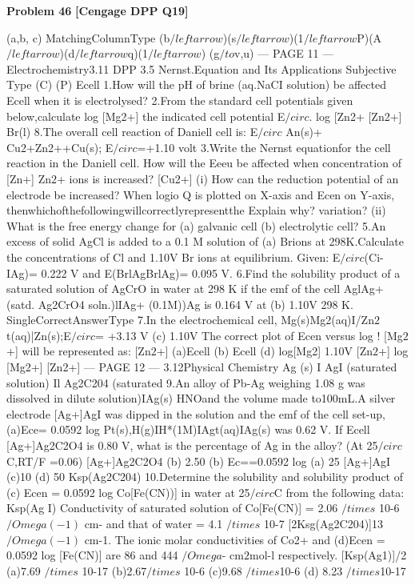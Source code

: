 \begin{problembox}
\textbf{Problem 46} \hfill \textbf{[Cengage DPP Q19]}
\label{q:ext-cng_dpp_all_questions-46}

(a,b, c)
MatchingColumnType
(b$/leftarrow$)(s$/leftarrow$)(1$/leftarrow$P)(A$/leftarrow$)(d$/leftarrow$q)(1$/leftarrow$)
(g$/to$v,u)
--- PAGE 11 ---
Electrochemistry3.11
DPP 3.5
Nernst.Equation and Its Applications
Subjective Type
(C)
(P)
Ecell
1.How will the pH of brine (aq.NaCI solution) be affected
Ecell
when it is electrolysed?
2.From the standard cell potentials given below,calculate
log [Mg2+]
the indicated cell potential E$/circ$.
log
[Zn2+
[Zn2+]
Br(l)
8.The overall cell reaction of Daniell cell is:
E$/circ$
An(s)+ Cu2+Zn2++Cu(s); E$/circ$=+1.10 volt
3.Write the Nernst equationfor the cell reaction in the Daniell
cell. How will the Eeeu be affected when concentration of
[Zn+]
Zn$2$+ ions is increased?
[Cu2+]
(i) How can the reduction potential of an electrode be
increased?
When logio Q is plotted on X-axis and Ecen on Y-axis,
thenwhichofthefollowingwillcorrectlyrepresentthe
Explain why?
variation?
(ii) What is the free energy change for (a) galvanic cell
(b) electrolytic cell?
5.An excess of solid AgCl is added to a 0.1 M solution of
(a)
Brions at 298K.Calculate the concentrations of Cl and
1.10V
Br ions at equilibrium.
Given: E$/circ$(Ci-IAg)= 0.222 V and E(BrlAgBrlAg)=
0.095 V.
6.Find the solubility product of a saturated solution of
AgCrO in water at 298 K if the emf of the cell AglAg+
(satd. Ag2CrO4 soln.)lIAg+ (0.1M))Ag is 0.164 V at
(b)
1.10V
298 K.
SingleCorrectAnswerType
7.In the electrochemical cell,
Mg(s)Mg2(aq)I/Zn$2$t(aq)|Zn(s);E$/circ$= +3.13 V
(c)
1.10V
The correct plot of Ecen versus log !
[Mg$2$+]
will be
represented as:
[Zn$2$+]
(a)Ecell
(b)
Ecell
(d)
log[Mg2]
1.10V
[Zn$2$+]
log [Mg2+]
[Zn2+]
--- PAGE 12 ---
3.12Physical Chemistry
Ag (s) I AgI (saturated solution) Il Ag2C204 (saturated
9.An alloy of Pb-Ag weighing 1.08 g was dissolved in dilute
solution)IAg(s)
HNOand the volume made to100mL.A silver electrode
[Ag+]AgI
was dipped in the solution and the emf of the cell set-up,
(a)Ece= 0.0592 log
Pt(s),H(g)IH*(1M)IAgt(aq)IAg(s) was 0.62 V. If Ecell
[Ag+]Ag2C2O4
is 0.80 V, what is the percentage of Ag in the alloy?
(At 25$/circ$C,RT/F =0.06)
[Ag+]Ag2C2O4
(b) 2.50
(b) Ec==0.0592 log
(a) 25
[Ag+]AgI
(c)10
(d) 50
Ksp(Ag2C204)
10.Determine the solubility and solubility product of
(c) Ecen = 0.0592 log
Co[Fe(CN))] in water at 25$/circ$C from the following data:
Ksp(Ag I)
Conductivity of saturated solution of Co[Fe(CN)]
= 2.06 $/times$ 10-6 $/Omega(-1)$ cm- and that of water = 4.1 $/times$ 10-7
[2Ksg(Ag2C204)]13
$/Omega(-1)$ cm-1. The ionic molar conductivities of Co2+ and
(d)Ecen = 0.0592 log
[Fe(CN)] are 86 and 444 $/Omega$- cm$2$mol-l respectively.
[Ksp(Ag1)]/2
(a)7.69 $/times$ 10-17
(b)2.67$/times$ 10-6
(c)9.68 $/times$10-6
(d) 8.23 $/times$10-17
\end{problembox}


